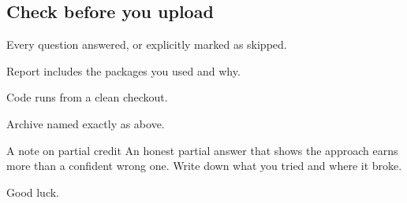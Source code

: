 \subsection*{Check before you upload}

\begin{checklist}
    \citem Every question answered, or explicitly marked as skipped.
    \item Report includes the packages you used and why.
    \item Code runs from a clean checkout.
    \item Archive named exactly as above.
\end{checklist}

\begin{asidebox}{A note on partial credit}
    An honest partial answer that shows the approach earns more than a
    confident wrong one. Write down what you tried and where it broke.
\end{asidebox}

Good luck.
